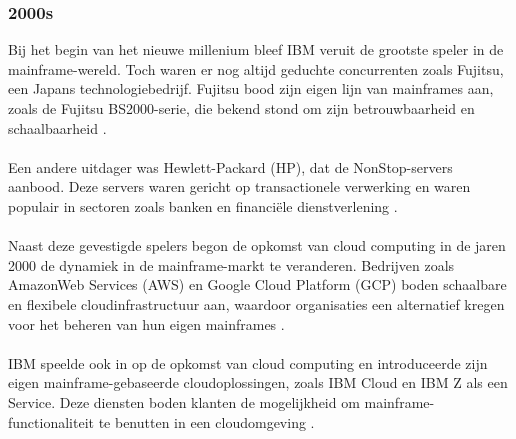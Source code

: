 \subsubsection{2000s}
Bij het begin van het nieuwe millenium bleef IBM veruit de grootste speler in de mainframe-wereld. Toch waren er nog altijd geduchte concurrenten zoals Fujitsu, een Japans technologiebedrijf. Fujitsu bood zijn eigen lijn van mainframes aan, zoals de Fujitsu BS2000-serie, die bekend stond om zijn betrouwbaarheid en schaalbaarheid \autocite{LaMonica2004}.
\\ \\
Een andere uitdager was Hewlett-Packard (HP), dat de NonStop-servers aanbood. Deze servers waren gericht op transactionele verwerking en waren populair in sectoren zoals banken en financiële dienstverlening \autocite{LaMonica2004}.
\\ \\
Naast deze gevestigde spelers begon de opkomst van cloud computing in de jaren 2000 de dynamiek in de mainframe-markt te veranderen. Bedrijven zoals AmazonWeb Services (AWS) en Google Cloud Platform (GCP) boden schaalbare en flexibele cloudinfrastructuur aan, waardoor organisaties een alternatief kregen voor het beheren van hun eigen mainframes \autocite{AWS} \autocite{Google}.
\\ \\
IBM speelde ook in op de opkomst van cloud computing en introduceerde zijn eigen mainframe-gebaseerde cloudoplossingen, zoals IBM Cloud en IBM Z als een Service. Deze diensten boden klanten de mogelijkheid om mainframe-functionaliteit te benutten in een cloudomgeving \autocite{IBM}.
\\ \\
